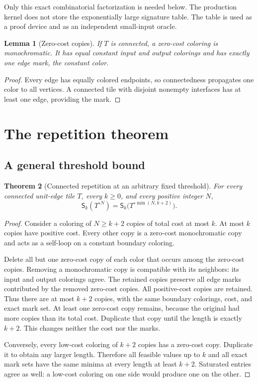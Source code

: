 \documentclass[11pt]{article}
\newtheorem{theorem}{Theorem}[section]
\newtheorem{lemma}[theorem]{Lemma}
\theoremstyle{remark}\newtheorem{remark}[theorem]{Remark}
\newcommand{\Sig}{\mathsf S}
\begin{document}
Only this exact combinatorial factorization is needed below. The production kernel does not store the exponentially large signature table. The table is used as a proof device and as an independent small-input oracle.

\begin{lemma}[Zero-cost copies]
\label{lem:zero}
If $T$ is connected, a zero-cost coloring is monochromatic. It has equal constant input and output colorings and has exactly one edge mark, the constant color.
\end{lemma}
\begin{proof}
Every edge has equally colored endpoints, so connectedness propagates one color to all vertices. A connected tile with disjoint nonempty interfaces has at least one edge, providing the mark.
\end{proof}

\section{The repetition theorem}
\subsection{A general threshold bound}
\begin{theorem}[Connected repetition at an arbitrary fixed threshold]
\label{thm:general}
For every connected unit-edge tile $T$, every $k\ge0$, and every positive integer $N$,
\[
 \Sig_k(T^{\circ N})
   =\Sig_k\bigl(T^{\circ\min(N,k+2)}\bigr).
\]
\end{theorem}
\begin{proof}
Consider a coloring of $N\ge k+2$ copies of total cost at most $k$. At most $k$ copies have positive cost. Every other copy is a zero-cost monochromatic copy and acts as a self-loop on a constant boundary coloring.

Delete all but one zero-cost copy of each color that occurs among the zero-cost copies. Removing a monochromatic copy is compatible with its neighbors: its input and output colorings agree. The retained copies preserve all edge marks contributed by the removed zero-cost copies. All positive-cost copies are retained. Thus there are at most $k+2$ copies, with the same boundary colorings, cost, and exact mark set. At least one zero-cost copy remains, because the original had more copies than its total cost. Duplicate that copy until the length is exactly $k+2$. This changes neither the cost nor the marks.

Conversely, every low-cost coloring of $k+2$ copies has a zero-cost copy. Duplicate it to obtain any larger length. Therefore all feasible values up to $k$ and all exact mark sets have the same minima at every length at least $k+2$. Saturated entries agree as well: a low-cost coloring on one side would produce one on the other.
\end{proof}
\end{document}

